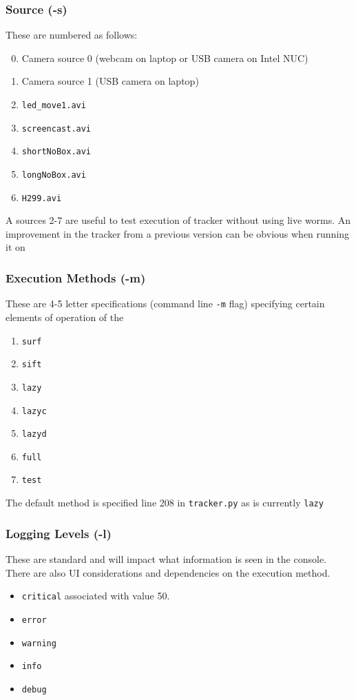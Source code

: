 \documentclass[fullpage]{report}
\begin{document}
\subsubsection{Source (-s)}
These are numbered as follows:
\begin{enumerate}
\setcounter{enumi}{-1}
\item Camera source 0 (webcam on laptop or USB camera on Intel NUC)
\item Camera source 1 (USB camera on laptop)
\item \verb|led_move1.avi|
\item \verb|screencast.avi|
\item \verb|shortNoBox.avi|
\item \verb|longNoBox.avi|
\item \verb|H299.avi|
\end{enumerate}
\noindent
A sources 2-7 are useful to test execution of tracker without using live worms. An improvement in the tracker from a previous version can be obvious when running it on 

\subsubsection{Execution Methods (-m)}
These are 4-5 letter specifications (command line \verb|-m| flag) specifying certain elements of operation of the  \vspace{5 mm}
\begin{enumerate}
\item \verb|surf|
\item \verb|sift|
\item \verb|lazy|
\item \verb|lazyc|
\item \verb|lazyd|
\item \verb|full|
\item \verb|test|
\end{enumerate}

The default method is specified line 208 in \verb|tracker.py| as is currently \verb|lazy|

\subsubsection{Logging Levels (-l)}
These are standard and will impact what information is seen in the console. There are also UI considerations and dependencies on the execution method. 
\begin{itemize}
\item \verb|critical| associated with value 50. 
\item \verb|error|
\item \verb|warning|
\item \verb|info|
\item \verb|debug|
\end{itemize}
\end{document}
